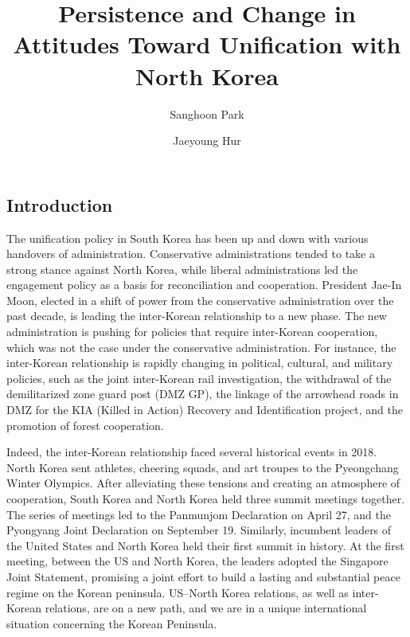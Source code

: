 \documentclass[letterpaper,9pt,twocolumn,twoside,]{pinp}
\title{Persistence and Change in Attitudes Toward Unification with North
Korea}
\author[a]{Sanghoon Park}
\author[b]{Jaeyoung Hur}
\affil[a]{Department of Political Science, University of South
Carolina, SC, USA}
\affil[b]{Global leaders College, Yonsei University, Seoul, ROK}
\begin{document}
\verticaladjustment{-2pt}

\maketitle
\thispagestyle{firststyle}



\hypertarget{introduction}{%
\subsection{Introduction}\label{introduction}}

The unification policy in South Korea has been up and down with various
handovers of administration. Conservative administrations tended to take
a strong stance against North Korea, while liberal administrations led
the engagement policy as a basis for reconciliation and cooperation.
President Jae-In Moon, elected in a shift of power from the conservative
administration over the past decade, is leading the inter-Korean
relationship to a new phase. The new administration is pushing for
policies that require inter-Korean cooperation, which was not the case
under the conservative administration. For instance, the inter-Korean
relationship is rapidly changing in political, cultural, and military
policies, such as the joint inter-Korean rail investigation, the
withdrawal of the demilitarized zone guard post (DMZ GP), the linkage of
the arrowhead roads in DMZ for the KIA (Killed in Action) Recovery and
Identification project, and the promotion of forest cooperation.

Indeed, the inter-Korean relationship faced several historical events in
2018. North Korea sent athletes, cheering squads, and art troupes to the
Pyeongchang Winter Olympics. After alleviating these tensions and
creating an atmosphere of cooperation, South Korea and North Korea held
three summit meetings together. The series of meetings led to the
Panmunjom Declaration on April 27, and the Pyongyang Joint Declaration
on September 19. Similarly, incumbent leaders of the United States and
North Korea held their first summit in history. At the first meeting,
between the US and North Korea, the leaders adopted the Singapore Joint
Statement, promising a joint effort to build a lasting and substantial
peace regime on the Korean peninsula. US--North Korea relations, as well
as inter-Korean relations, are on a new path, and we are in a unique
international situation concerning the Korean Peninsula.
\end{document}
